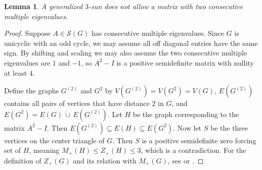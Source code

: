 \documentclass[11pt]{article}
\newtheorem{lem}[thm]{Lemma}
\theoremstyle{definition}
\newtheorem{rem}[thm]{Remark}
\theoremstyle{definition}
\theoremstyle{definition}
\newcommand{\dcup}{\,\dot{\cup}\,}
\newcommand{\mptn}{\mathcal{S}} %
\begin{document}


\begin{lem}\label{3sunlem}
A generalized $3$-sun does not allow a matrix with two consecutive multiple eigenvalues.
\end{lem}
\begin{proof}
Suppose $A\in \mptn(G)$ has consecutive multiple eigenvalues.  Since $G$ is unicyclic with an odd cycle, we may assume all off diagonal entries have the same sign.  By shifting and scaling we may also assume the two consecutive multiple eigenvalues are $1$ and $-1$, so $A^2-I$ is a positive semidefinite matrix with nullity at least $4$.

Define the graphs $G^{(2)}$ and $G^2$ by $V(G^{(2)})=V(G^2)=V(G)$,  $E(G^{(2)})$ contains all pairs of vertices that have distance $2$ in $G$, and $E(G^2)=E(G)\dcup E(G^{(2)})$. Let $H$ be the graph corresponding to the matrix $A^2-I$.   Then {$E(G^{(2)})\subseteq E(H)\subseteq E(G^2)$}. 
 Now let $S$ be the three vertices on the center triangle of $G$.  Then $S$ is a positive semidefinite zero forcing set of $H$, meaning $M_+(H)\leq Z_+(H)\leq 3$, which is a contradiction.  For the definition of $Z_+(G)$ and its relation with $M_+(G)$, see \cite{smallparam} or \cite{HLA2}.
\end{proof}
\end{document}
